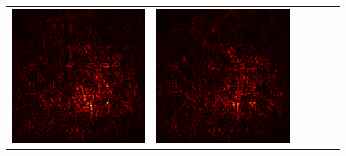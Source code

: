 \documentclass[preprint,12pt]{elsarticle}
\begin{document}
\begin{figure}[ht]
\begin{tabular}{cccccc}
  \includegraphics[scale=\scale]{../visualizations/examples/imagenette/resnet18/positive_saliency_map/1.png} & 
  \includegraphics[scale=\scale]{../visualizations/examples/imagenette/resnet18/negative_saliency_map/1.png} & 

\end{tabular}
\end{figure}
\end{document}
